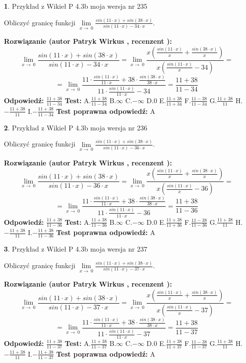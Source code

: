 \documentclass[12pt, a4paper]{article}
\theoremstyle{definition} %
\newtheorem{zad}{}
\newcommand{\zadStart}[1]{\begin{zad}#1\newline}
\newcommand{\zadStop}{\end{zad}}
\newcommand{\rozwStart}[2]{\noindent \textbf{Rozwiązanie (autor #1 , recenzent #2): }\newline}
\newcommand{\rozwStop}{\newline}
\newcommand{\odpStart}{\noindent \textbf{Odpowiedź:}\newline}
\newcommand{\odpStop}{\newline}
\newcommand{\testStart}{\noindent \textbf{Test:}\newline}
\newcommand{\testStop}{\newline}
\newcommand{\kluczStart}{\noindent \textbf{Test poprawna odpowiedź:}\newline}
\newcommand{\kluczStop}{\newline}
\begin{document}
\zadStart{Przykład z Wikieł P 4.3b moja wersja nr 235}


Obliczyć granicę funkcji $\lim\limits_{x\to\ 0}\frac{sin(11 \cdot x)+sin(38 \cdot x)}{sin(11 \cdot x)-34 \cdot x}$.
\zadStop
\rozwStart{Patryk Wirkus}{}
$$\lim\limits_{x\to\ 0}\frac{sin(11 \cdot x)+sin(38 \cdot x)}{sin(11 \cdot x)-34 \cdot x}=\lim\limits_{x\to\ 0}\frac{x(\frac{sin(11 \cdot x)}{x}+\frac{sin(38 \cdot x)}{x})}{x(\frac{sin(11 \cdot x)}{x}-34)}=$$
$$=\lim\limits_{x\to\ 0}\frac{11 \cdot \frac{sin(11 \cdot x)}{11 \cdot x}+38 \cdot \frac{sin(38 \cdot x)}{38 \cdot x}}{11 \cdot \frac{sin(11 \cdot x)}{11 \cdot x}-34}=\frac{11+38}{11-34}$$
\rozwStop
\odpStart
$\frac{11+38}{11-34}$
\odpStop
\testStart
A.$\frac{11+38}{11-34}$
B.$\infty$
C.$-\infty$
D.$0$
E.$\frac{11+38}{11+34}$
F.$\frac{11-38}{11-34}$
G.$\frac{11+38}{11}$
H.$-\frac{11+38}{11}$
I.$-\frac{11+38}{11-34}$
\testStop
\kluczStart
A
\kluczStop



\zadStart{Przykład z Wikieł P 4.3b moja wersja nr 236}


Obliczyć granicę funkcji $\lim\limits_{x\to\ 0}\frac{sin(11 \cdot x)+sin(38 \cdot x)}{sin(11 \cdot x)-36 \cdot x}$.
\zadStop
\rozwStart{Patryk Wirkus}{}
$$\lim\limits_{x\to\ 0}\frac{sin(11 \cdot x)+sin(38 \cdot x)}{sin(11 \cdot x)-36 \cdot x}=\lim\limits_{x\to\ 0}\frac{x(\frac{sin(11 \cdot x)}{x}+\frac{sin(38 \cdot x)}{x})}{x(\frac{sin(11 \cdot x)}{x}-36)}=$$
$$=\lim\limits_{x\to\ 0}\frac{11 \cdot \frac{sin(11 \cdot x)}{11 \cdot x}+38 \cdot \frac{sin(38 \cdot x)}{38 \cdot x}}{11 \cdot \frac{sin(11 \cdot x)}{11 \cdot x}-36}=\frac{11+38}{11-36}$$
\rozwStop
\odpStart
$\frac{11+38}{11-36}$
\odpStop
\testStart
A.$\frac{11+38}{11-36}$
B.$\infty$
C.$-\infty$
D.$0$
E.$\frac{11+38}{11+36}$
F.$\frac{11-38}{11-36}$
G.$\frac{11+38}{11}$
H.$-\frac{11+38}{11}$
I.$-\frac{11+38}{11-36}$
\testStop
\kluczStart
A
\kluczStop



\zadStart{Przykład z Wikieł P 4.3b moja wersja nr 237}


Obliczyć granicę funkcji $\lim\limits_{x\to\ 0}\frac{sin(11 \cdot x)+sin(38 \cdot x)}{sin(11 \cdot x)-37 \cdot x}$.
\zadStop
\rozwStart{Patryk Wirkus}{}
$$\lim\limits_{x\to\ 0}\frac{sin(11 \cdot x)+sin(38 \cdot x)}{sin(11 \cdot x)-37 \cdot x}=\lim\limits_{x\to\ 0}\frac{x(\frac{sin(11 \cdot x)}{x}+\frac{sin(38 \cdot x)}{x})}{x(\frac{sin(11 \cdot x)}{x}-37)}=$$
$$=\lim\limits_{x\to\ 0}\frac{11 \cdot \frac{sin(11 \cdot x)}{11 \cdot x}+38 \cdot \frac{sin(38 \cdot x)}{38 \cdot x}}{11 \cdot \frac{sin(11 \cdot x)}{11 \cdot x}-37}=\frac{11+38}{11-37}$$
\rozwStop
\odpStart
$\frac{11+38}{11-37}$
\odpStop
\testStart
A.$\frac{11+38}{11-37}$
B.$\infty$
C.$-\infty$
D.$0$
E.$\frac{11+38}{11+37}$
F.$\frac{11-38}{11-37}$
G.$\frac{11+38}{11}$
H.$-\frac{11+38}{11}$
I.$-\frac{11+38}{11-37}$
\testStop
\kluczStart
A
\kluczStop
\end{document}
